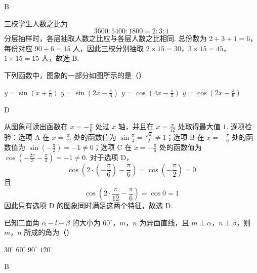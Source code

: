 \begin{answer}
B
\end{answer}

\begin{solution}
三校学生人数之比为
\[
3600:5400:1800=2:3:1
\]
分层抽样时，各层抽取人数之比应与各层人数之比相同. 总份数为 \(2+3+1=6\)，每份对应
\(90\div6=15\) 人，因此三校分别抽取
\(2\times15=30\)，\(3\times15=45\)，\(1\times15=15\)
人，故选 B.
\end{solution}

\begin{problem}
下列函数中，图象的一部分如图所示的是（\quad）


\choices
    {\(y = \sin \left(x + \frac{\pi}{6}\right)\)}
    {\(y = \sin \left(2x - \frac{\pi}{6}\right)\)}
    {\( y = \cos \left(4x - \frac{\pi}{3}\right) \)}
    {\( y = \cos \left(2x - \frac{\pi}{6}\right) \)}
\end{problem}

\begin{answer}
D
\end{answer}

\begin{solution}
从图象可读出函数在 \(x=-\frac{\pi}{6}\) 处过 \(x\) 轴，并且在
\(x=\frac{\pi}{12}\) 处取得最大值 \(1\). 逐项检验：选项 A 在
\(x=\frac{\pi}{12}\) 处的函数值为
\(\sin\frac{\pi}{4}=\frac{\sqrt{2}}{2}\ne1\)；选项 B 在
\(x=-\frac{\pi}{6}\) 处的函数值为
\(\sin\left(-\frac{\pi}{2}\right)=-1\ne0\)；选项 C 在
\(x=-\frac{\pi}{6}\) 处的函数值为
\(\cos\left(-\frac{2\pi}{3}-\frac{\pi}{3}\right)=-1\ne0\). 对于选项 D，
\[
\cos\left(2\cdot\left(-\frac{\pi}{6}\right)-\frac{\pi}{6}\right)
=\cos\left(-\frac{\pi}{2}\right)=0
\]
且
\[
\cos\left(2\cdot\frac{\pi}{12}-\frac{\pi}{6}\right)=\cos0=1
\]
因此只有选项 D 的图象同时满足这两个特征，故选 D.
\end{solution}

\begin{problem}
已知二面角 \(\alpha - l - \beta\) 的大小为 \(60^{\circ}\)，\(m\)，\(n\) 为异面直线，且 \(m \perp \alpha\)，\(n \perp \beta\)，则 \(m\)，\(n\) 所成的角为（\quad）

\choices
    {\(30^{\circ}\)}
    {\(60^{\circ}\)}
    {\(90^{\circ}\)}
    {\(120^{\circ}\)}
\end{problem}

\begin{answer}
B
\end{answer}

